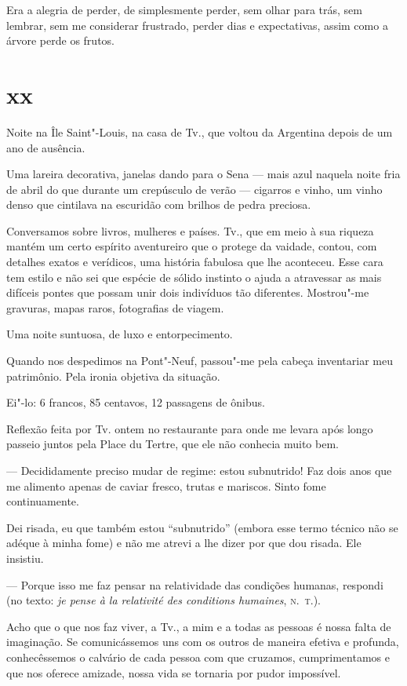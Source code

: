 Era a alegria de perder, de simplesmente perder, sem olhar para trás,
sem lembrar, sem me considerar frustrado, perder dias e expectativas,
assim como a árvore perde os frutos.

\section{xx}

Noite na Île Saint"-Louis, na casa de Tv., que voltou da Argentina depois
de um ano de ausência.

Uma lareira decorativa, janelas dando para o Sena --- mais azul naquela
noite fria de abril do que durante um crepúsculo de verão --- cigarros e
vinho, um vinho denso que cintilava na escuridão com brilhos de pedra
preciosa.

Conversamos sobre livros, mulheres e países. Tv., que em meio à sua
riqueza mantém um certo espírito aventureiro que o protege da vaidade,
contou, com detalhes exatos e verídicos, uma história fabulosa que lhe
aconteceu. Esse cara tem estilo e não sei que espécie de sólido
instinto o ajuda a atravessar as mais difíceis pontes que possam
unir dois indivíduos tão diferentes. Mostrou"-me gravuras, mapas raros,
fotografias de viagem.

Uma noite suntuosa, de luxo e entorpecimento.

Quando nos despedimos na Pont"-Neuf, passou"-me pela cabeça inventariar
meu patrimônio. Pela ironia objetiva da situação.

Ei"-lo: 6 francos, 85 centavos, 12 passagens de ônibus.

\pagebreak
\asterisc

Reflexão feita por Tv. ontem no restaurante para onde me levara após
longo passeio juntos pela Place du Tertre, que ele não conhecia muito
bem.

--- Decididamente preciso mudar de regime: estou subnutrido! Faz dois anos que me alimento apenas de caviar fresco, trutas e mariscos. Sinto fome continuamente.

Dei risada, eu que também estou ``subnutrido'' (embora esse termo
técnico não se adéque à minha fome) e não me atrevi a lhe dizer por que
dou risada. Ele insistiu.

--- Porque isso me faz pensar na relatividade das condições humanas, respondi (no texto: \emph{je pense à la relativité des conditions humaines}, \textsc{n.~t.}).

\asterisc

Acho que o que nos faz viver, a Tv., a mim e a todas as pessoas é
nossa falta de imaginação. Se comunicássemos uns com os outros de
maneira efetiva e profunda, conhecêssemos o calvário de cada pessoa
com que cruzamos, cumprimentamos e que nos oferece amizade, nossa
vida se tornaria por pudor impossível.

